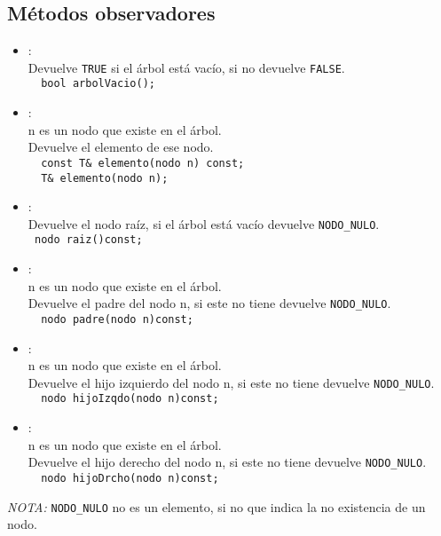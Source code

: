 \subsection*{Métodos observadores}
\begin{itemize}
  \item {}:\\
   Devuelve \texttt{TRUE} si el árbol está vacío, si no devuelve \texttt{FALSE}.\\
  \verb|  bool arbolVacio();|
  \item {}:\\
   n es un nodo que existe en el árbol. \\
   Devuelve el elemento de ese nodo.\\
  \verb|  const T& elemento(nodo n) const;|\\
  \verb|  T& elemento(nodo n);|
  \item {}:\\
   Devuelve el nodo raíz, si el árbol está vacío devuelve \texttt{NODO\_NULO}.\\
  \verb| nodo raiz()const;|
  \item {}:\\
   n es un nodo que existe en el árbol.\\
   Devuelve el padre del nodo n, si este no tiene devuelve \texttt{NODO\_NULO}.\\
  \verb|  nodo padre(nodo n)const;|
  \item {}:\\
   n es un nodo que existe en el árbol.\\
   Devuelve el hijo izquierdo del nodo n, si este no tiene devuelve \texttt{NODO\_NULO}.\\
  \verb|  nodo hijoIzqdo(nodo n)const;| 
  \item {}:\\
   n es un nodo que existe en el árbol.\\
   Devuelve el hijo derecho del nodo n, si este no tiene devuelve \texttt{NODO\_NULO}.\\
  \verb|  nodo hijoDrcho(nodo n)const;| 
\end{itemize}

\textit{NOTA:} \texttt{NODO\_NULO} no es un elemento, si no que indica la no existencia de un nodo.
